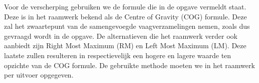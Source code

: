\documentclass[10pt, a4paper]{article}
\begin{document}
Voor de verscherping gebruiken we de formule die in de opgave vermeldt staat. Deze is in het raamwerk bekend als de Centre of Gravity (COG) formule. Deze zal het zwaartepunt van de samengevoegde vaagverzamelingen nemen, zoals dus gevraagd wordt in de opgave. De alternatieven die het raamwerk verder ook aanbiedt zijn Right Most Maximum (RM) en Left Most Maximum (LM). Deze laatste zullen resulteren in respectievelijk een hogere en lagere waarde ten opzichte van de COG formule. De gebruikte methode moeten we in het raamwerk per uitvoer opgegeven.








\end{document}
